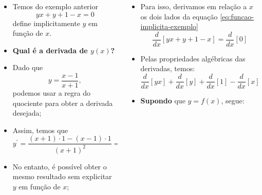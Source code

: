 \begin{frame}
  \begin{columns}[onlytextwidth]
    \begin{column}{0.49\textwidth}\vspace*{-0.5cm}
      \begin{itemize}\justifying
      
        \item Temos do exemplo anterior
        \begin{equation}\label{eq:funcao-implicita-exemplo}
          yx + y + 1 - x = 0
        \end{equation}
        define implicitamente $y$ em função de $x$.
        \item \textbf{Qual é a derivada de $y(x)$?}
        \item Dado que
        \begin{equation*}
          y = \frac{x-1}{x+1},
        \end{equation*}
        podemos usar a regra do quociente para obter a derivada desejada;
        \item Assim, temos que
        \begin{equation*}
          y^{\prime} = \frac{(x+1)\cdot 1 - (x-1)\cdot 1}{(x+1)^{2}} = \frac{2}{(x+1)^{2}}
        \end{equation*}
        \item No entanto, é possível obter o mesmo resultado sem explicitar $y$ em função de $x$;
      \end{itemize}
    \end{column}
    \begin{column}{0.49\textwidth}\vspace*{-0.5cm}
      \begin{itemize}
        \item Para isso, derivamos em relação a $x$ os dois lados da equação \eqref{eq:funcao-implicita-exemplo}
        \begin{equation*}
          \frac{d}{dx}\left[yx + y + 1 - x\right] = \frac{d}{dx}\left[0\right]
        \end{equation*}
        \item Pelas propriedades algébricas das derivadas, temos:
        \begin{equation*}
          \frac{d}{dx}\left[yx\right] + \frac{d}{dx}\left[y\right] + \frac{d}{dx}\left[1\right] - \frac{d}{dx}\left[x\right] = 0
        \end{equation*}
        \item \textbf{Supondo} que $y=f(x)$, segue:

\end{itemize}
\end{column}
\end{columns}
\end{frame}

